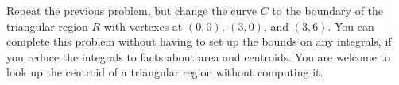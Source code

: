 \begin{problem}
Repeat the previous problem, but change the curve $C$ to the boundary of the triangular region $R$ with vertexes at $(0,0)$, $(3,0)$, and $(3,6)$.  You can complete this problem without having to set up the bounds on any integrals, if you reduce the integrals to facts about area and centroids. You are welcome to look up the centroid of a triangular region without computing it.
\end{problem}


% 
% 
% 

